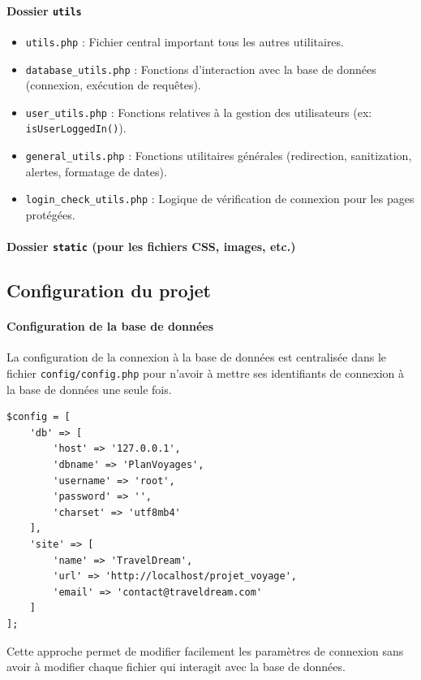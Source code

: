 \documentclass[a4paper,12pt]{article}
\begin{document}
\paragraph{Dossier \texttt{utils}}
\begin{itemize}
     \item \texttt{utils.php} : Fichier central important tous les autres utilitaires.
     \item \texttt{database\_utils.php} : Fonctions d'interaction avec la base de données (connexion, exécution de requêtes).
     \item \texttt{user\_utils.php} : Fonctions relatives à la gestion des utilisateurs (ex: \texttt{isUserLoggedIn()}).
     \item \texttt{general\_utils.php} : Fonctions utilitaires générales (redirection, sanitization, alertes, formatage de dates).
     \item \texttt{login\_check\_utils.php} : Logique de vérification de connexion pour les pages protégées.
\end{itemize}

\paragraph{Dossier \texttt{static} (pour les fichiers CSS, images, etc.)}

\vspace{0.5em}
\subsection{Configuration du projet}

\paragraph{Configuration de la base de données}
La configuration de la connexion à la base de données est centralisée dans le fichier \texttt{config/config.php} pour n'avoir à mettre ses identifiants de connexion à la base de données une seule fois.
\begin{lstlisting}
$config = [
    'db' => [
        'host' => '127.0.0.1',
        'dbname' => 'PlanVoyages',
        'username' => 'root',
        'password' => '',
        'charset' => 'utf8mb4'
    ],
    'site' => [
        'name' => 'TravelDream',
        'url' => 'http://localhost/projet_voyage',
        'email' => 'contact@traveldream.com'
    ]
];
\end{lstlisting}

Cette approche permet de modifier facilement les paramètres de connexion sans avoir à modifier chaque fichier qui interagit avec la base de données.
\end{document}
